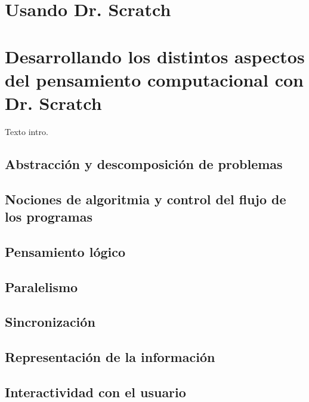 \documentclass[a4paper,10pt]{article}
\begin{document}
\section{Usando Dr. Scratch}

\section{Desarrollando los distintos aspectos del pensamiento computacional con Dr. Scratch}
Texto intro.
\subsection{Abstracción y descomposición de problemas}
\subsection{Nociones de algoritmia y control del flujo de los programas}
\subsection{Pensamiento lógico}
\subsection{Paralelismo}
\subsection{Sincronización}
\subsection{Representación de la información}
\subsection{Interactividad con el usuario}
\end{document}
